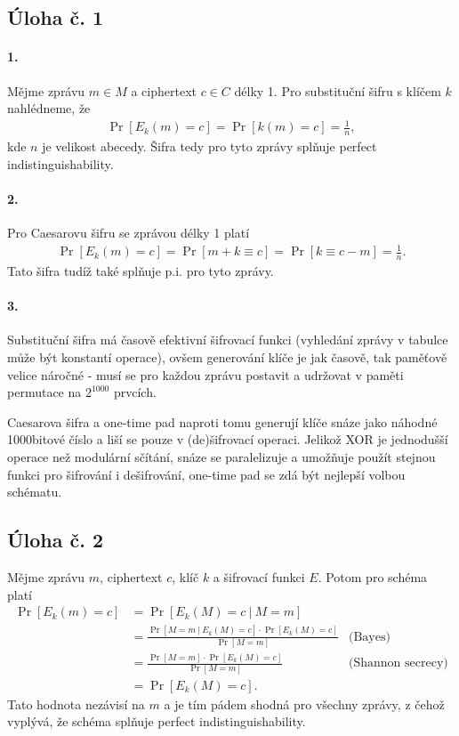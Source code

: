 \documentclass{scrartcl}
\DeclareMathOperator{\Prob}{\text{Pr}}
\begin{document}
    \subsection*{Úloha č. 1}
    \paragraph{1.}
    Mějme zprávu $m \in M$ a ciphertext $c \in C$ délky 1. Pro substituční šifru s klíčem $k$ nahlédneme, že
    \begin{align*}
        \Prob[E_k(m) = c] = \Prob[k(m) = c] = \frac{1}{n},
    \end{align*}
    kde $n$ je velikost abecedy. Šifra tedy pro tyto zprávy splňuje perfect indistinguishability.

    \paragraph{2.}
    Pro Caesarovu šifru se zprávou délky 1 platí
    \begin{align*}
        \Prob[E_k(m) = c] = \Prob[m+k \equiv c] = \Prob[k \equiv c-m] = \frac{1}{n}.
    \end{align*}
    Tato šifra tudíž také splňuje p.i. pro tyto zprávy.

    \paragraph{3.} Substituční šifra má časově efektivní šifrovací funkci (vyhledání zprávy v tabulce může být konstantí operace), ovšem generování klíče je jak časově, tak paměťově velice náročné - musí se pro každou zprávu postavit a udržovat v paměti permutace na $2^{1000}$ prvcích.

    Caesarova šifra a one-time pad naproti tomu generují klíče snáze jako náhodné 1000bitové číslo a liší se pouze v (de)šifrovací operaci. Jelikož XOR je jednodušší operace než modulární sčítání, snáze se paralelizuje a umožňuje použít stejnou funkci pro šifrování i dešifrování, one-time pad se zdá být nejlepší volbou schématu. 

    \subsection*{Úloha č. 2}
    Mějme zprávu $m$, ciphertext $c$, klíč $k$ a šifrovací funkci $E$. Potom pro schéma platí
    \begingroup
    \addtolength{\jot}{0.7em}
    \begin{align*}
        \Prob[E_k(m) = c] &= \Prob[E_k(M) = c\ \vert\ M = m] \\
        &= \frac{\Prob[M = m \ |\ E_k(M) = c] \cdot \Prob[E_k(M) = c]}{\Prob[M = m]} & \text{(Bayes)} \\
        &= \frac{\Prob[M = m] \cdot \Prob[E_k(M) = c]}{\Prob[M = m]} & \text{(Shannon secrecy)} \\
        &= \Prob[E_k(M) = c].
    \end{align*}
    \endgroup
    Tato hodnota nezávisí na $m$ a je tím pádem shodná pro všechny zprávy, z čehož vyplývá, že schéma splňuje perfect indistinguishability.
\end{document}
